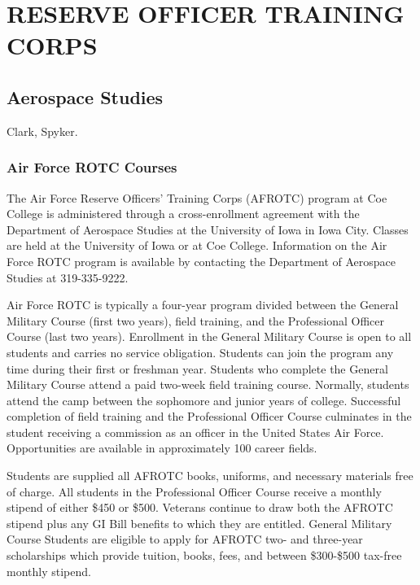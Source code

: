 \documentclass[
  letterpaper,
]{scrbook}
\begin{document}
\hypertarget{reserve-officer-training-corps}{%
\chapter{RESERVE OFFICER TRAINING
CORPS}\label{reserve-officer-training-corps}}

\hypertarget{aerospace-studies}{%
\section{Aerospace Studies}\label{aerospace-studies}}

Clark, Spyker.

\hypertarget{air-force-rotc-courses}{%
\subsection{Air Force ROTC Courses}\label{air-force-rotc-courses}}

The Air Force Reserve Officers' Training Corps (AFROTC) program at Coe
College is administered through a cross-enrollment agreement with the
Department of Aerospace Studies at the University of Iowa in Iowa City.
Classes are held at the University of Iowa or at Coe College.
Information on the Air Force ROTC program is available by contacting the
Department of Aerospace Studies at 319-335-9222.

Air Force ROTC is typically a four-year program divided between the
General Military Course (first two years), field training, and the
Professional Officer Course (last two years). Enrollment in the General
Military Course is open to all students and carries no service
obligation. Students can join the program any time during their first or
freshman year. Students who complete the General Military Course attend
a paid two-week field training course. Normally, students attend the
camp between the sophomore and junior years of college. Successful
completion of field training and the Professional Officer Course
culminates in the student receiving a commission as an officer in the
United States Air Force. Opportunities are available in approximately
100 career fields.

Students are supplied all AFROTC books, uniforms, and necessary
materials free of charge. All students in the Professional Officer
Course receive a monthly stipend of either \$450 or \$500. Veterans
continue to draw both the AFROTC stipend plus any GI Bill benefits to
which they are entitled. General Military Course Students are eligible
to apply for AFROTC two- and three-year scholarships which provide
tuition, books, fees, and between \$300-\$500 tax-free monthly stipend.
\end{document}
